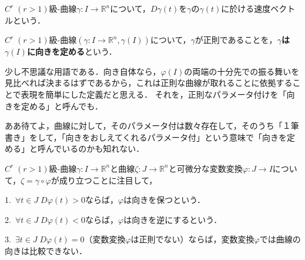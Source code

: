\documentclass[uplatex, dvipdfmx]{jsreport}
\begin{document}
\begin{definition}[速度ベクトル]
    $C^r\;(r>1)$級-曲線$\gamma:I\to\mathbb{R}^n$について，$D\gamma(t)$を$\gamma$の$\gamma (t)$に於ける速度ベクトルという．
\end{definition}

\begin{definition}[曲線に向きを定めるパラメータ]
    $C^r\;(r>1)$級-曲線$(\gamma:I\to\mathbb{R}^n, \gamma(I))$について，$\gamma$が正則であることを，\textbf{$\gamma$は$\gamma(I)$に向きを定める}という．
\end{definition}
\begin{remark}
    少し不思議な用語である．向き自体なら，$\varphi(I)$の両端の十分先での振る舞いを見比べれば決まるはずであるから，これは正則な曲線が取れることに依拠することで表現を簡単にした定義だと思える．
    それを，正則なパラメータ付けを「向きを定める」と呼んでも．

    ああ待てよ，曲線に対して，そのパラメータ付は数々存在して，そのうち「１筆書き」をして，「向きをおしえてくれるパラメータ付」という意味で「向きを定める」と呼んでいるのかも知れない．
\end{remark}

\begin{definition}\rm{}
    $C^r\;(r>1)$級-曲線$\gamma:I\to\mathbb{R}^n$と曲線$\zeta:J\to\mathbb{R}^n$と可微分な変数変換$\varphi:J\to I$について，$\zeta =\gamma\circ\varphi$が成り立つことに注目して，

    1.\, $\forall t\in J\; D\varphi(t)>0$ならば，$\varphi$は向きを保つという．

    2.\, $\forall t\in J\; D\varphi(t)<0$ならば，$\varphi$は向きを逆にするという．

    3.\, $\exists t\in J\; D\varphi(t)=0$（変数変換$\varphi$は正則でない）ならば，変数変換$\varphi$では曲線の向きは比較できない．
\end{definition}
\end{document}
